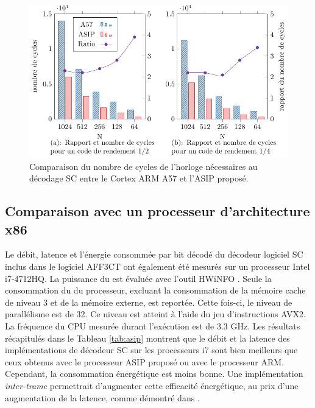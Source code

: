 \begin{figure}[htp]
\centering
\includegraphics{main/ch3_fig/curves/cycle_count/cycle_count}
\caption{Comparaison du nombre de cycles de l'horloge nécessaires au décodage SC entre le Cortex ARM A57 et l'ASIP proposé.}
\label{fig:cycle_count}
\end{figure}

\subsection{Comparaison avec un processeur d'architecture x86}
Le débit, latence et l'énergie consommée par bit décodé du décodeur logiciel SC inclus dans le logiciel AFF3CT ont également été mesurés sur un processeur Intel i7-4712HQ.
La puissance du \coeur est évaluée avec l'outil HWiNFO \cite{noauthor_hwinfo_nodate}. Seule la consommation du \coeur du processeur, excluant la consommation de la mémoire cache de niveau 3 et de la mémoire externe, est reportée. Cette fois-ci, le niveau de parallélisme est de 32. Ce niveau est atteint à l'aide du jeu d'instructions AVX2. La fréquence du CPU mesurée durant l'exécution est de 3.3 GHz. Les résultats récapitulés dans le Tableau \ref{tab:asip} montrent que le débit et la latence des implémentations de décodeur SC sur les processeurs i7 sont bien meilleurs que ceux obtenus avec le processeur ASIP proposé ou avec le processeur ARM. Cependant, la consommation énergétique est moins bonne. Une implémentation \textit{inter-trame} permettrait d'augmenter cette efficacité énergétique, au prix d'une augmentation de la latence, comme démontré dans \cite{cassagne_energy_2016}.


